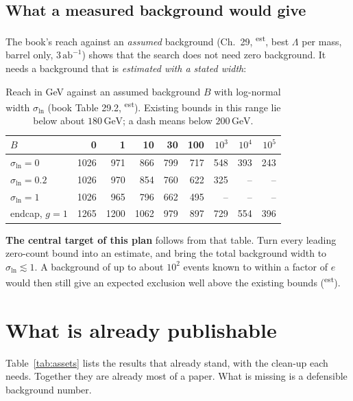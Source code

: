 \documentclass[11pt,a4paper]{article}
\newcommand{\EST}{\textsuperscript{\textsf{est}}}
\newcommand{\GeV}{\,\mathrm{GeV}}
\newcommand{\abinv}{\,\mathrm{ab}^{-1}}
\begin{document}
\subsection{What a measured background would give}
The book's reach against an \emph{assumed} background (Ch.~29, \EST, best $\Lambda$ per mass, barrel only, $3\abinv$)
shows that the search does not need zero background. It needs a background that is \emph{estimated with a stated
width}:

\begin{table}[h]
\centering\small
\caption{Reach in GeV against an assumed background $B$ with log-normal width $\sigma_{\ln}$ (book Table 29.2, \EST).
Existing bounds in this range lie below about $180\GeV$; a dash means below $200\GeV$.}\label{tab:reach}
\begin{tabular}{@{}lrrrrrrrr@{}}
\toprule
$B$ & 0 & 1 & 10 & 30 & 100 & $10^3$ & $10^4$ & $10^5$\\
\midrule
$\sigma_{\ln}=0$   & 1026 & 971 & 866 & 799 & 717 & 548 & 393 & 243\\
$\sigma_{\ln}=0.2$ & 1026 & 970 & 854 & 760 & 622 & 325 & --  & -- \\
$\sigma_{\ln}=1$   & 1026 & 965 & 796 & 662 & 495 & --  & --  & -- \\
endcap, $g=1$      & 1265 & 1200 & 1062 & 979 & 897 & 729 & 554 & 396\\
\bottomrule
\end{tabular}
\end{table}

\textbf{The central target of this plan} follows from that table. Turn every leading zero-count bound into an estimate,
and bring the total background width to $\sigma_{\ln}\lesssim1$. A background of up to about $10^2$ events known to within
a factor of $e$ would then still give an expected exclusion well above the existing bounds (\EST).

\section{What is already publishable}
Table~\ref{tab:assets} lists the results that already stand, with the clean-up each needs. Together they are already
most of a paper. What is missing is a defensible background number.
\end{document}
